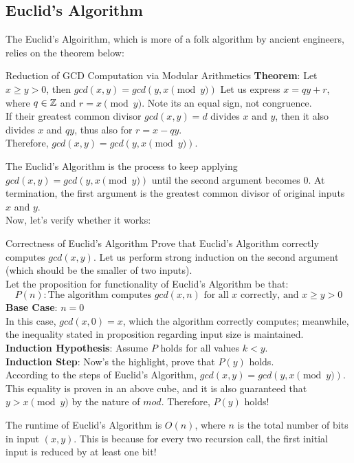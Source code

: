 \subsection{Euclid's Algorithm}
The Euclid's Algoirithm, which is more of a folk algorithm by ancient engineers, relies on the theorem below:
\begin{ln-theorem}{Reduction of GCD Computation via Modular Arithmetics}{}
    \textbf{Theorem}: Let $x \geq y > 0$, then $gcd(x, y) = gcd(y, x\pmod{y})$
    \tcblower
    Let us express $x = qy + r$, where $q \in \mathbb{Z}$ and $r = x\pmod{y}$. Note its an equal sign, not congruence. \\
    If their greatest common divisor $gcd(x, y) = d$ divides $x$ and $y$, then it also divides $x$ and $qy$, thus also for $r = x - qy$. \\
    Therefore, $gcd(x, y) = gcd(y, x\pmod{y})$.
\end{ln-theorem}
The Euclid's Algorithm is the process to keep applying $gcd(x, y) = gcd(y, x\pmod{y})$ until the second argument becomes $0$. At termination, the first argument is the greatest common divisor of original inputs $x$ and $y$. \\
Now, let's verify whether it works:
\begin{ln-theorem}{Correctness of Euclid's Algorithm}{}
    Prove that Euclid's Algorithm correctly computes $gcd(x, y)$.
    \tcblower
    Let us perform strong induction on the second argument (which should be the smaller of two inputs). \\
    Let the proposition for functionality of Euclid's Algorithm be that:
    \[P(n) : \text{The algorithm computes $gcd(x, n)$ for all $x$ correctly, and $x \geq y > 0$}\]
    \textbf{Base Case}: $n = 0$ \\
    In this case, $gcd(x, 0) = x$, which the algorithm correctly computes; meanwhile, the inequality stated in proposition regarding input size is maintained. \\
    \textbf{Induction Hypothesis}: Assume $P$ holds for all values $k < y$. \\
    \textbf{Induction Step}: Now's the highlight, prove that $P(y)$ holds. \\
    According to the steps of Euclid's Algorithm, $gcd(x, y) = gcd(y, x\pmod{y})$. This equality is proven in an above cube, and it is also guaranteed that $y > x\pmod{y}$ by the nature of $mod$. Therefore, $P(y)$ holds! 
\end{ln-theorem}
The runtime of Euclid's Algorithm is $O(n)$, where $n$ is the total number of bits in input $(x, y)$. This is because for every two recursion call, the first initial input is reduced by at least one bit!


